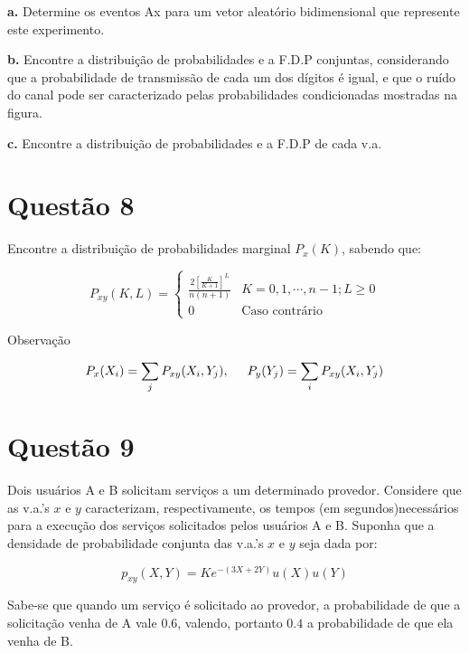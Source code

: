 \documentclass[a5paper]{report}
\begin{document}
\textbf{a.} Determine os eventos Ax para um vetor aleatório bidimensional que represente este experimento.

\textbf{b.} Encontre a distribuição de probabilidades e a F.D.P conjuntas, considerando que a probabilidade de transmissão de cada um dos dígitos é igual, e que o ruído do canal pode ser caracterizado pelas probabilidades condicionadas mostradas na figura.

\textbf{c.} Encontre a distribuição de probabilidades e a F.D.P de cada v.a.


\section*{Questão 8}
Encontre a distribuição de probabilidades marginal $P_x(K)$, sabendo que:

\begin{equation*}
	P_{xy}(K, L) = 
	\begin{cases}
		\frac{2\left[\frac{K}{K + 1}\right]^L}{n(n + 1)} & K = 0, 1, \cdots, n - 1; L \geq 0\\
		0 \hspace{1cm}                                   & \text{Caso contrário} 
	\end{cases}
\end{equation*}

Observação

\[
	P_x(X_i) = 	\sum_{j} P_{xy}(X_i, Y_j), \hspace{0.5cm}
	P_y(Y_j) =  \sum_{i} P_{xy}(X_i, Y_j)
\]


\section*{Questão 9}
Dois usuários A e B solicitam serviços a um determinado provedor. Considere que as v.a.'s $x$ e $y$ caracterizam, respectivamente, os tempos (em segundos)necessários para a execução dos serviços solicitados pelos usuários A e B.
Suponha que a densidade de probabilidade conjunta das v.a.'s $x$ e $y$ seja dada por:

\[p_{xy}(X, Y) = Ke^{-(3X + 2Y)}u(X)u(Y)\]

Sabe-se que quando um serviço é solicitado ao provedor, a probabilidade de que
a solicitação venha de A vale $0.6$, valendo, portanto $0.4$ a probabilidade de que ela venha de B.
\end{document}
